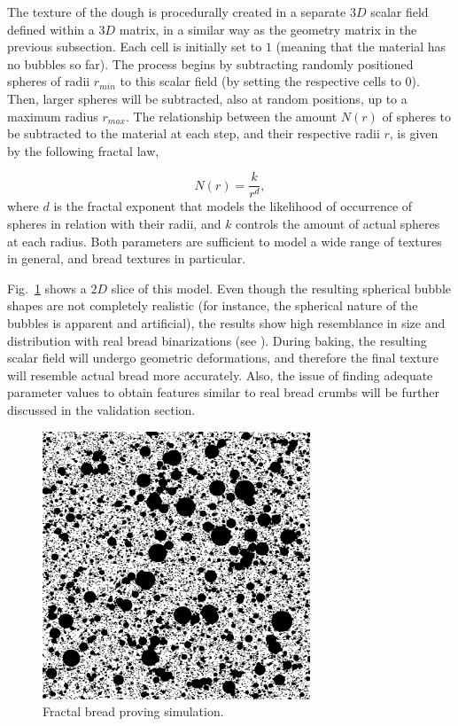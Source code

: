 The texture of the dough is procedurally created in a separate $3D$ scalar field defined within a $3D$ matrix, in a similar way as the geometry matrix in the previous subsection.
Each cell is initially set to $1$ (meaning that the material has no bubbles so far).
The process begins by subtracting randomly positioned spheres of radii $r_{min}$ to this scalar field (by setting the respective cells to $0$).
Then, larger spheres will be subtracted, also at random positions, up to a maximum radius $r_{max}$.
The relationship between the amount $N(r)$ of spheres to be subtracted to the material at each step, and their respective radii $r$, is given by the following fractal law,

\begin{equation*}
N(r) = \frac{k}{r^{d}},
\end{equation*}
where $d$ is the fractal exponent that models the likelihood of occurrence of spheres in relation with their radii, and $k$ controls the amount of actual spheres at each radius. 
Both parameters are sufficient to model a wide range of textures in general, and bread textures in particular.

Fig.~\ref{FigProving} shows a $2D$ slice of this model.
Even though the resulting spherical bubble shapes are not completely realistic (for instance, the spherical nature of the bubbles is apparent and artificial), the results show high resemblance in size and distribution with real bread binarizations (see \cite{Babin2006}).
During baking, the resulting scalar field will undergo geometric deformations, and therefore the final texture will resemble actual bread more accurately.
Also, the issue of finding adequate parameter values to obtain features similar to real bread crumbs will be further discussed in the validation section.

\begin{figure}
\center
\includegraphics[width=8cm]{figures/bubbles}
\caption{Fractal bread proving simulation.}
\label{FigProving}
\end{figure}

